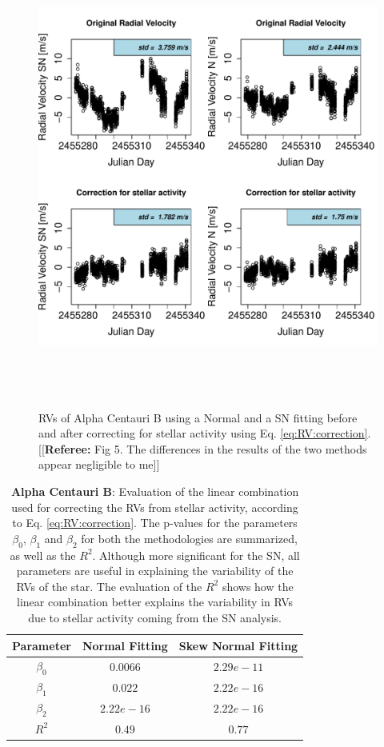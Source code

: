 \documentclass[11pt, oneside]{article}
\newcommand{\comment}[1]{{\color{red}[[\textbf{Referee: }#1]]}}
\begin{document}
\begin{figure}[htbp]
   \centering
\includegraphics[height = 6in]{HD12862_[3]CorrectionActivity_RadialVelocity_vs_time.pdf} 
   \caption{RVs of Alpha Centauri B using a Normal and a SN fitting before and after correcting for stellar activity using Eq. \ref{eq:RV:correction}.
 \comment{Fig 5. The differences in the results of the two methods appear negligible to me}
   }
   \label{fig:alphacent:correctionRV}
\end{figure}

\begin{table}[!t]
\begin{tabular}{|c|c|c|}
\hline
Parameter          & Normal Fitting         &   Skew Normal Fitting \\
\hline
$\beta_{0}$            &    $0.0066$    & $2.29e-11$ \\
\hline
$\beta_{1}$            &    $0.022$    & $2.22e-16$ \\
\hline
$\beta_{2}$            &     $2.22e-16$   &  $ 2.22e-16 $ \\
\hline
$R^{2}$      &     $0.49$    &  $0.77$   \\
\hline
\end{tabular}
\caption{\textbf{Alpha Centauri B}: Evaluation of the linear combination used for correcting the RVs from stellar activity, according to Eq. \ref{eq:RV:correction}. The p-values for the parameters $\beta_{0}$, $\beta_{1}$ and $\beta_{2}$ for both the methodologies are summarized, as well as the $R^2$. Although more significant for the SN, all parameters are useful in explaining the variability of the RVs of the star. The evaluation of the $R^2$ shows how the linear combination better explains the variability in RVs due to stellar activity coming from the SN analysis.}
\label{table:alfa:test}
\end{table}
\end{document}
